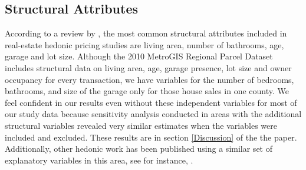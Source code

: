 \documentclass{article}\usepackage{graphicx, color}
\begin{document}
\subsection{Structural Attributes}
According to a review by \cite{Wilhelmsson2000}, the most common structural attributes included in real-estate hedonic pricing studies are living area, number of bathrooms, age, garage and lot size.  Although the 2010 MetroGIS Regional Parcel Dataset includes structural data on living area, age, garage presence, lot size and owner occupancy for every transaction, we have variables for the number of bedrooms, bathrooms, and size of the garage only for those house sales in one county. We feel confident in our results even without these independent variables for most of our study data because sensitivity analysis conducted in areas with the additional structural variables revealed very similar estimates when the variables were included and excluded. These results are in section \ref{Discussion} of the the paper. Additionally, other hedonic work has been published using a similar set of explanatory variables in this area, see for instance, \citet{Sander2009b}.
\end{document}
